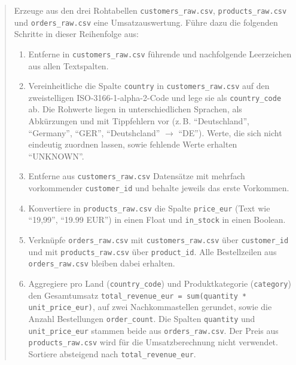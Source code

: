 \begin{quote}
    Erzeuge aus den drei Rohtabellen \texttt{customers\_raw.csv},
    \texttt{products\_raw.csv} und \texttt{orders\_raw.csv} eine
    Umsatzauswertung. Führe dazu die folgenden Schritte in dieser Reihenfolge
    aus:

    \begin{enumerate}
        \item Entferne in \texttt{customers\_raw.csv} führende und nachfolgende
        Leerzeichen aus allen Textspalten.
        \item Vereinheitliche die Spalte \texttt{country} in
        \texttt{customers\_raw.csv} auf den zweistelligen
        ISO-3166-1-alpha-2-Code und lege sie als \texttt{country\_code} ab. Die
        Rohwerte liegen in unterschiedlichen Sprachen, als Abkürzungen und mit
        Tippfehlern vor (z.\,B. \enquote{Deutschland}, \enquote{Germany},
        \enquote{GER}, \enquote{Deutshcland} $\rightarrow$ \enquote{DE}). Werte,
        die sich nicht eindeutig zuordnen lassen, sowie fehlende Werte erhalten
        \enquote{UNKNOWN}.
        \item Entferne aus \texttt{customers\_raw.csv} Datensätze mit mehrfach
        vorkommender \texttt{customer\_id} und behalte jeweils das erste
        Vorkommen.
        \item Konvertiere in \texttt{products\_raw.csv} die Spalte
        \texttt{price\_eur} (Text wie \enquote{19,99}, \enquote{19.99 EUR}) in
        einen Float und \texttt{in\_stock} in einen Boolean.
        \item Verknüpfe \texttt{orders\_raw.csv} mit
        \texttt{customers\_raw.csv} über \texttt{customer\_id} und mit
        \texttt{products\_raw.csv} über \texttt{product\_id}. Alle Bestellzeilen
        aus \texttt{orders\_raw.csv} bleiben dabei erhalten.
        \item Aggregiere pro Land (\texttt{country\_code}) und Produktkategorie
        (\texttt{category}) den Gesamtumsatz \texttt{total\_revenue\_eur =
        sum(quantity * unit\_price\_eur)}, auf zwei Nachkommastellen gerundet,
        sowie die Anzahl Bestellungen \texttt{order\_count}. Die Spalten
        \texttt{quantity} und \texttt{unit\_price\_eur} stammen beide aus
        \texttt{orders\_raw.csv}. Der Preis aus \texttt{products\_raw.csv} wird
        für die Umsatzberechnung nicht verwendet. Sortiere absteigend nach
        \texttt{total\_revenue\_eur}.
    \end{enumerate}
\end{quote}

